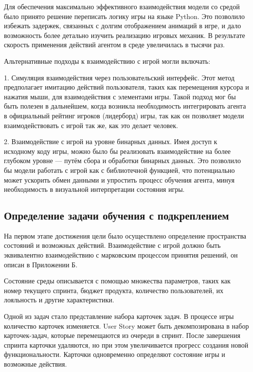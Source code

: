 \documentclass{article}
\begin{document}
Для обеспечения максимально эффективного взаимодействия модели со средой было принято решение переписать логику игры на языке Python. 
Это позволило избежать задержек, связанных с долгим отображением анимаций в игре, и дало возможность более детально изучить реализацию игровых механик. 
В результате скорость применения действий агентом в среде увеличилась в тысячи раз.

Альтернативные подходы к взаимодействию с игрой могли включать:

1. Симуляция взаимодействия через пользовательский интерфейс. 
Этот метод предполагает имитацию действий пользователя, таких как перемещения курсора и нажатия мыши, для взаимодействия с элементами игры. 
Такой подход мог бы быть полезен в дальнейшем, когда возникла необходимость интегрировать агента в официальный рейтинг игроков (лидерборд) игры, так как он позволяет модели взаимодействовать с игрой так же, как это делает человек.

2. Взаимодействие с игрой на уровне бинарных данных. 
Имея доступ к исходному коду игры, можно было бы реализовать взаимодействие на более глубоком уровне — путём сбора и обработки бинарных данных. 
Это позволило бы модели работать с игрой как с библиотечной функцией, что потенциально может ускорить обмен данными и упростить процесс обучения агента, минуя необходимость в визуальной интерпретации состояния игры.

\subsection{Определение задачи обучения с подкреплением}

На первом этапе достижения цели было осуществлено определение пространства состояний и возможных действий.
Взаимодействие с игрой должно быть эквивалентно взаимодействию с марковским процессом принятия решений, он описан в Приложении Б.

Состояние среды описывается с помощью множества параметров, таких как номер текущего спринта, бюджет продукта, количество пользователей, их лояльность и другие характеристики.

Одной из задач стало представление набора карточек задач.
В процессе игры количество карточек изменяется. 
User Story может быть декомпозирована в набор карточек-задач, которые перемещаются из очереди в спринт. 
После завершения спринта карточки удаляются, но при этом увеличивается прогресс создания новой функциональности. 
Карточки одновременно определяют состояние игры и возможные действия.
\end{document}
